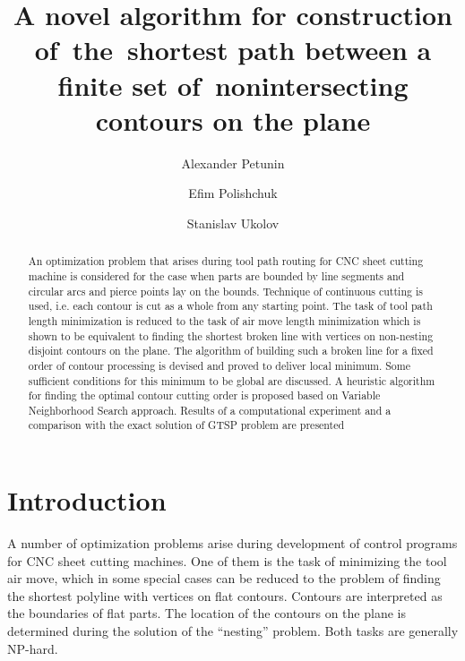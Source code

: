 \documentclass[]{llncs}
\begin{document}
\title{A novel algorithm for construction of~the~shortest path
between a finite set of~nonintersecting contours on the plane}


\author{
  Alexander	Petunin  
  \and
  Efim Polishchuk 
  \and
  Stanislav	Ukolov  
}


\maketitle

\begin{abstract}
An optimization problem that arises during
tool path routing for
CNC sheet cutting machine
is considered
for the case when
parts are bounded by
line segments and circular arcs
and pierce points lay
on the bounds.
Technique of
continuous cutting is used,
i.e.
each contour is cut as a whole
from any starting point.
The task of
tool path length minimization
is reduced to the task
of air move length minimization
which is shown to be equivalent
to finding the shortest broken line
with vertices on
non-nesting disjoint contours on the plane.
The algorithm of building such
a broken line
for a fixed order of contour processing
is devised
and proved to deliver local minimum.
Some sufficient conditions
for this minimum to be global
are discussed.
A heuristic algorithm
for finding the optimal contour cutting order
is proposed
based on
Variable Neighborhood Search approach.
Results of a computational experiment
and a comparison with the exact solution
of GTSP problem are presented

\end{abstract}

\section{Introduction}

A number of optimization problems arise
during development of control programs for CNC sheet cutting machines.
One of them is
the task of minimizing the tool air move,
which in some special cases can be reduced
to the problem of finding the shortest polyline
with vertices on flat contours.
Contours are interpreted as the boundaries of flat parts.
The location of the contours on the plane is determined
during the solution of the ``nesting'' problem.
Both tasks are generally NP-hard.
\end{document}
